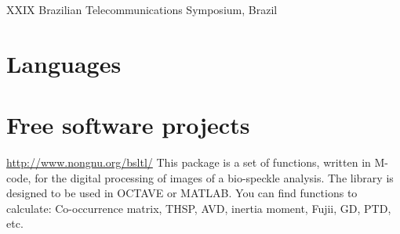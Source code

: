 \documentclass[11pt,a4paper,sans]{moderncv} %
\begin{document}
	      {}{}{}
	      {XXIX Brazilian Telecommunications Symposium, Brazil}







\section{Languages}


 
\section{Free software projects}

			{\url{http://www.nongnu.org/bsltl/}}
			{}{}
			{This package is a set of functions, written in M-code, 
			for the digital processing of images  of a bio-speckle analysis.
			The library is designed to be used in OCTAVE or MATLAB.
			You can find functions to calculate:
			Co-occurrence matrix, THSP, AVD, inertia moment,
			Fujii, GD, PTD, etc.}
\end{document}
